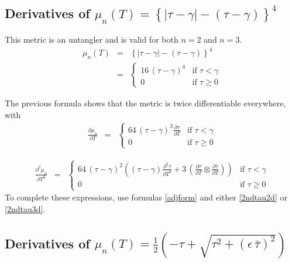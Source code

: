 \documentclass{report}
\begin{document}
\subsection{Derivatives of $\mu_n(T) = \left\{ |\tau-\gamma| - \left( \tau-\gamma \right) \right\}^4$ \label{untangle1}}

\noindent This metric is an untangler and is valid for both $n=2$ and $n=3$. 
\begin{eqnarray}
\mu_n(T) & = & \left\{ |\tau-\gamma| - \left( \tau-\gamma \right) \right\}^4 \\
         & = & \left\{ \begin{array}{cc} 
 16 \, (\tau-\gamma)^4 & \mbox{if $\tau<\gamma$} \\
0                      & \mbox{if $\tau \geq 0$}
\end{array} \right.
\end{eqnarray}

\noindent The previous formula shows that the metric is twice differentiable everywhere, with
\begin{eqnarray}
\frac{\partial \mu_n}{\partial T} & = & \left\{ \begin{array}{cc} 
64 \, (\tau-\gamma)^3 \frac{\partial \tau}{\partial T} & \mbox{if $\tau<\gamma$} \\
0                      & \mbox{if $\tau \geq 0$}
\end{array} \right.
\end{eqnarray}

\begin{eqnarray}
\frac{\partial^2 \mu_n}{\partial T^2} & = & \left\{ \begin{array}{cc} 
64 \, (\tau-\gamma)^2 \left( (\tau-\gamma) \frac{\partial^2 \tau}{\partial T^2} + 3 \, \left( \frac{\partial \tau}{\partial T} \otimes \frac{\partial \tau}{\partial T} \right) \right) & \mbox{if $\tau<\gamma$} \\
0                      & \mbox{if $\tau \geq 0$}
\end{array} \right.
\end{eqnarray}
To complete these expressions, use formulas \ref{adjform} and either 
\ref{2ndtau2d} or \ref{2ndtau3d}. \newline

\subsection{Derivatives of $\mu_n(T) = \frac{1}{2} \left( - \tau + \sqrt{\tau^2 + \left(\epsilon \, \bar{\tau} \right)^2} \right)$ \label{untangle2}}
\end{document}
